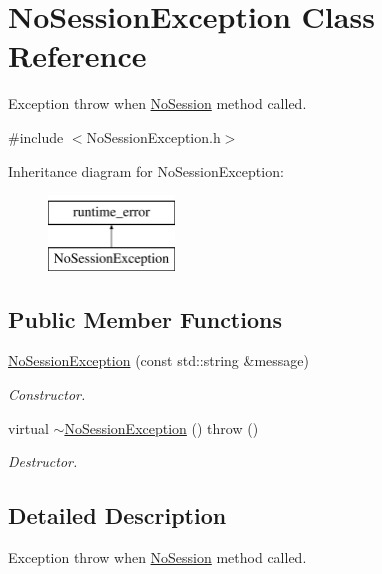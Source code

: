 \hypertarget{class_no_session_exception}{\section{No\-Session\-Exception Class Reference}
\label{class_no_session_exception}
}


Exception throw when \hyperlink{class_no_session}{No\-Session} method called.  




{\ttfamily \#include $<$No\-Session\-Exception.\-h$>$}

Inheritance diagram for No\-Session\-Exception\-:\begin{figure}[H]
\begin{center}
\leavevmode
\includegraphics[height=2.000000cm]{class_no_session_exception}
\end{center}
\end{figure}
\subsection*{Public Member Functions}
\begin{DoxyCompactItemize}
\item 
\hyperlink{class_no_session_exception_a536189505d19a738bb58484317f9c065}{No\-Session\-Exception} (const std\-::string \&message)
\begin{DoxyCompactList}\small\item\em Constructor. \end{DoxyCompactList}\item 
\hypertarget{class_no_session_exception_ae031ed3a616a6449f09f1c9366d99322}{virtual \hyperlink{class_no_session_exception_ae031ed3a616a6449f09f1c9366d99322}{$\sim$\-No\-Session\-Exception} ()  throw ()}\label{class_no_session_exception_ae031ed3a616a6449f09f1c9366d99322}

\begin{DoxyCompactList}\small\item\em Destructor. \end{DoxyCompactList}\end{DoxyCompactItemize}


\subsection{Detailed Description}
Exception throw when \hyperlink{class_no_session}{No\-Session} method called. 

